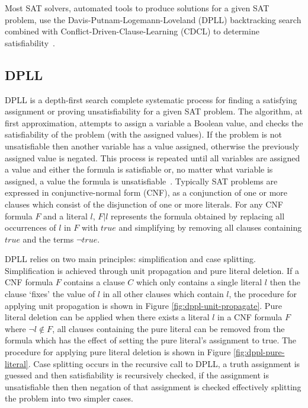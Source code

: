 \documentclass[]{final_report}
\begin{document}
Most SAT solvers, automated tools to produce solutions for a given SAT problem, use the Davis-Putnam-Logemann-Loveland (DPLL) backtracking search combined with Conflict-Driven-Clause-Learning (CDCL) to determine satisfiability~\cite{zhang2001efficient, gomes2008satisfiability}.

\subsection{DPLL}
DPLL is a depth-first search complete systematic process for finding a satisfying assignment or proving unsatisfiability for a given SAT problem. The algorithm, at first approximation, attempts to assign a variable a Boolean value, and checks the satisfiability of the problem (with the assigned values). If the problem is not unsatisfiable then another variable has a value assigned, otherwise the previously assigned value is negated. This process is repeated until all variables are assigned a value and either the formula is satisfiable or, no matter what variable is assigned, a value the formula is unsatisfiable~\cite{sattosmt}. Typically SAT problems are expressed in conjunctive-normal form (CNF), as a conjunction of one or more clauses which consist of the disjunction of one or more literals. 
For any CNF formula $F$ and a literal $l$, $\mathit{F}|l$ represents the formula obtained by replacing all occurrences of $l$ in $F$ with $true$ and simplifying by removing all clauses containing $true$ and the terms $\lnot{true}$. 

DPLL relies on two main principles: simplification and case splitting. Simplification is achieved through unit propagation and pure literal deletion. If a CNF formula $\mathit{F}$ contains a clause $C$ which only contains a single literal $l$ then the clause `fixes' the value of $l$ in all other clauses which contain $l$, the procedure for applying unit propagation is shown in Figure \ref{fig:dppl-unit-propagate}. Pure literal deletion can be applied when there exists a literal $l$ in a CNF formula $\mathit{F}$ where $\lnot{l} \notin \mathit{F}$, all clauses containing the pure literal can be removed from the formula which has the effect of setting the pure literal's assignment to true. The procedure for applying pure literal deletion is shown in Figure \ref{fig:dppl-pure-literal}. Case splitting occurs in the recursive call to DPLL, a truth assignment is guessed and then satisfiability is recursively checked, if the assignment is unsatisfiable then then negation of that assignment is checked effectively splitting the problem into two simpler cases.
\end{document}
